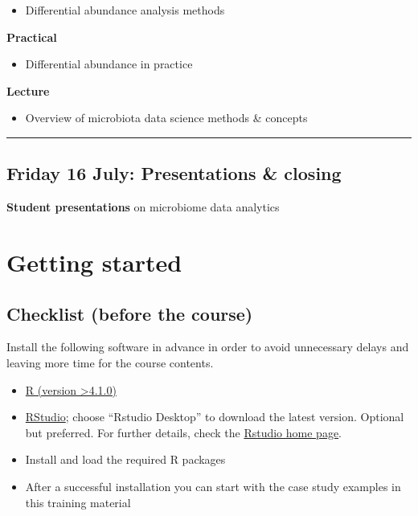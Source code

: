 \documentclass[
]{book}
\providecommand{\tightlist}{%
  \setlength{\itemsep}{0pt}\setlength{\parskip}{0pt}}
\begin{document}
\begin{itemize}
\tightlist
\item
  Differential abundance analysis methods
\end{itemize}

\textbf{Practical}

\begin{itemize}
\tightlist
\item
  Differential abundance in practice
\end{itemize}

\textbf{Lecture}

\begin{itemize}
\tightlist
\item
  Overview of microbiota data science methods \& concepts
\end{itemize}

\begin{center}\rule{0.5\linewidth}{0.5pt}\end{center}

\hypertarget{friday-16-july-presentations-closing}{%
\section{Friday 16 July: Presentations \& closing}\label{friday-16-july-presentations-closing}}

\textbf{Student presentations} on microbiome data analytics

\hypertarget{getting-started}{%
\chapter{Getting started}\label{getting-started}}

\hypertarget{checklist-before-the-course}{%
\section{Checklist (before the course)}\label{checklist-before-the-course}}

Install the following software in advance in order to avoid
unnecessary delays and leaving more time for the course contents.

\begin{itemize}
\item
  \href{https://www.r-project.org/}{R (version \textgreater4.1.0)}
\item
  \href{https://www.rstudio.com/products/rstudio/download/}{RStudio};
  choose ``Rstudio Desktop'' to download the latest version. Optional
  but preferred. For further details, check the \href{https://www.rstudio.com/}{Rstudio home
  page}.
\item
  Install and load the required R packages
\item
  After a successful installation you can start with the
  case study examples in this training material
\end{itemize}
\end{document}
